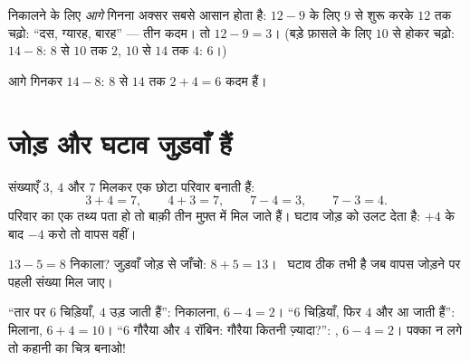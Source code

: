 \begin{method}[आगे गिनना]\label{met:g1:subtraction:countup}
 निकालने के लिए \emph{आगे} गिनना अक्सर सबसे आसान होता है:
$12 - 9$ के लिए $9$ से शुरू करके $12$ तक चढ़ो: ``दस, ग्यारह,
बारह'' --- तीन कदम। तो $12 - 9 = 3$। (बड़े फ़ासले के लिए $10$ से
होकर चढ़ो: $14 - 8$: $8$ से $10$ तक $2$, $10$ से $14$
तक $4$:  $6$।)
\end{method}

\begin{omfigure}

{\small आगे गिनकर $14 - 8$: $8$ से $14$ तक
$2 + 4 = 6$ कदम हैं।}
\end{omfigure}

\section{जोड़ और घटाव जुड़वाँ हैं}

\begin{example}[तथ्यों का परिवार]\label{ex:g1:subtraction:family}
संख्याएँ $3$, $4$ और $7$ मिलकर एक छोटा परिवार बनाती हैं:
\[
3 + 4 = 7, \qquad
4 + 3 = 7, \qquad
7 - 4 = 3, \qquad
7 - 3 = 4 .
\]
परिवार का एक तथ्य पता हो तो बाक़ी तीन मुफ़्त में मिल जाते हैं।
घटाव जोड़ को उलट देता है: $+4$ के बाद $-4$ करो तो वापस वहीं।
\end{example}

\begin{example}[जाँच]\label{ex:g1:subtraction:check}
$13 - 5 = 8$ निकाला? जुड़वाँ जोड़ से जाँचो:
$8 + 5 = 13$। \checkmark\ घटाव ठीक तभी है जब वापस जोड़ने पर
पहली संख्या मिल जाए।
\end{example}

\begin{example}[कौन-सी संक्रिया?]\label{ex:g1:subtraction:choose}
``तार पर $6$ चिड़ियाँ, $4$ उड़ जाती हैं'': निकालना, $6 - 4 = 2$।
``$6$ चिड़ियाँ, फिर $4$ और आ जाती हैं'': मिलाना, $6 + 4 = 10$।
``$6$ गौरैया और $4$ रॉबिन: गौरैया कितनी ज़्यादा?'':
, $6 - 4 = 2$। पक्का न लगे तो कहानी का चित्र बनाओ!
\end{example}

